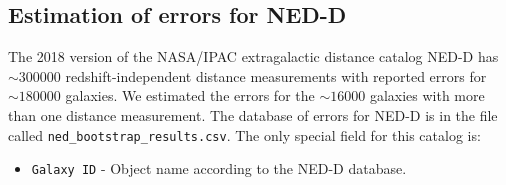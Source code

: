 \documentclass[a4paper,fleqn,usenatbib]{mnras}
\begin{document}
\subsection{Estimation of errors for NED-D}
The 2018 version of the NASA/IPAC extragalactic distance catalog NED-D has $\sim300000$ redshift-independent distance measurements with reported errors for $\sim180000$ galaxies. We estimated the errors for the $\sim16000$ galaxies with more than one distance measurement. The database of errors for NED-D is in the file called \texttt{ned\_bootstrap\_results.csv}. The only special field for this catalog is:
\begin{itemize}
\item \texttt{Galaxy ID} - Object name according to the NED-D database.
\end{itemize}








\bsp	%
\label{lastpage}
\end{document}
